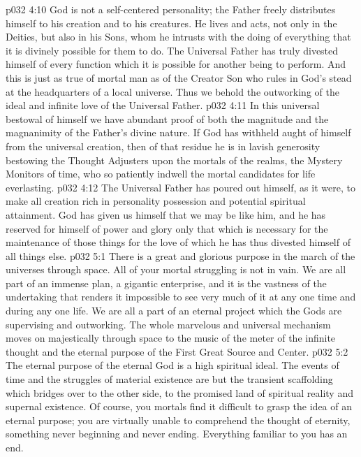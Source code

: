\vs p032 4:10 \pc God is not a self\hyp{}centered personality; the Father freely distributes himself to his creation and to his creatures. He lives and acts, not only in the Deities, but also in his Sons, whom he intrusts with the doing of everything that it is divinely possible for them to do. The Universal Father has truly divested himself of every function which it is possible for another being to perform. And this is just as true of mortal man as of the Creator Son who rules in God’s stead at the headquarters of a local universe. Thus we behold the outworking of the ideal and infinite love of the Universal Father.
\vs p032 4:11 In this universal bestowal of himself we have abundant proof of both the magnitude and the magnanimity of the Father’s divine nature. If God has withheld aught of himself from the universal creation, then of that residue he is in lavish generosity bestowing the Thought Adjusters upon the mortals of the realms, the Mystery Monitors of time, who so patiently indwell the mortal candidates for life everlasting.
\vs p032 4:12 The Universal Father has poured out himself, as it were, to make all creation rich in personality possession and potential spiritual attainment. God has given us himself that we may be like him, and he has reserved for himself of power and glory only that which is necessary for the maintenance of those things for the love of which he has thus divested himself of all things else.
\vs p032 5:1 There is a great and glorious purpose in the march of the universes through space. All of your mortal struggling is not in vain. We are all part of an immense plan, a gigantic enterprise, and it is the vastness of the undertaking that renders it impossible to see very much of it at any one time and during any one life. We are all a part of an eternal project which the Gods are supervising and outworking. The whole marvelous and universal mechanism moves on majestically through space to the music of the meter of the infinite thought and the eternal purpose of the First Great Source and Center.
\vs p032 5:2 The eternal purpose of the eternal God is a high spiritual ideal. The events of time and the struggles of material existence are but the transient scaffolding which bridges over to the other side, to the promised land of spiritual reality and supernal existence. Of course, you mortals find it difficult to grasp the idea of an eternal purpose; you are virtually unable to comprehend the thought of eternity, something never beginning and never ending. Everything familiar to you has an end.
